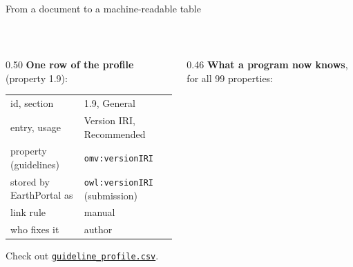 \documentclass[aspectratio=169,10pt]{beamer}
\newcommand{\evidence}[1]{{\scriptsize\color{epgrey}#1}}
\newcommand{\code}[1]{\texttt{\small #1}}
\begin{document}
\begin{frame}{From a document to a machine-readable table}
  \centering
  \\[4pt]
  \begin{columns}[T]
    \begin{column}{0.50\textwidth}
      \small
      \textbf{One row of the profile} (property 1.9):\\[3pt]
      \scriptsize
      \begin{tabular}{@{}l l@{}}
        \toprule
        id, section & 1.9, General\\
        entry, usage & Version IRI, Recommended\\
        property (guidelines) & \code{omv:versionIRI}\\
        stored by EarthPortal as & \code{owl:versionIRI} (submission)\\
        link rule & manual\\
        who fixes it & author\\
        \bottomrule
      \end{tabular}
      \evidence{Check out \href{https://github.com/EarthPortal/SA_Management/blob/main/earthportal_sa_audit/mapping/guideline_profile.csv}{\code{guideline\_profile.csv}}.}
    \end{column}
    \begin{column}{0.46\textwidth}
      \small
      \textbf{What a program now knows}, for all 99 properties:

\end{column}
\end{columns}
\end{frame}
\end{document}
